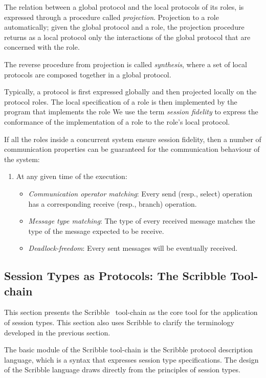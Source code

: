 The relation between a global protocol and the
local protocols of its roles, is expressed
through a procedure called {\em projection}.
Projection to a role
automatically;
given the global protocol and a role, the projection 
procedure returns as a local protocol only the
interactions of the global protocol that are concerned with
the role.

The reverse procedure from projection is called {\em synthesis},
where a set of local protocols are composed together in a global
protocol.

Typically, a protocol is first expressed globally and then
projected locally on the protocol roles.
The local specification of a role is then
implemented by the program that implements the role
We use the term {\em session fidelity} to express
the conformance of the implementation of a role to the role's
local protocol.

If all the roles inside a concurrent system ensure session
fidelity,
then a number of communication properties can be guaranteed
for the communication behaviour of the system:
\begin{enumerate}[label=$\bullet$]
	\item	At any given time of the execution:
	\begin{itemize}
		\item	{\em Communication operator matching}: Every send (resp., select) operation has a corresponding receive (resp., branch) operation.
		\item	{\em Message type matching}: The type of every received message matches the type of the message expected to be receive.
		\item	{\em Deadlock-freedom}: Every sent messages will be eventually received.
	\end{itemize}
\end{enumerate}

\subsection{Session Types as Protocols: The Scribble Tool-chain}

This section presents the Scribble~\cite{scribble} tool-chain
as the core tool for the application of session types. This section
also uses Scribble to clarify the terminology developed in the
previous section.

The basic module of the Scribble tool-chain is the Scribble
protocol description language, which is a syntax that
expresses session type specifications.
The design of the Scribble language draws directly from
the principles of session types.

